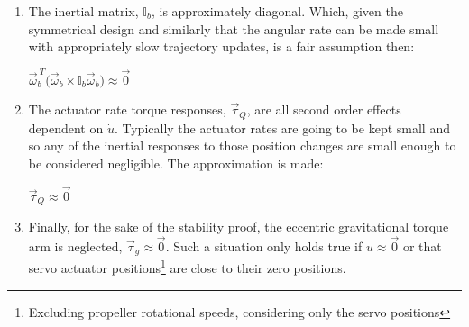 \begin{enumerate}[itemsep=0em]
\item The inertial matrix, $\mathbb{I}_b$, is approximately diagonal. Which, given the symmetrical design and similarly that the angular rate can be made small with appropriately slow trajectory updates, is a fair assumption then:
\begin{center}
\vspace{-10pt}
$\vec{\omega}_b^{~T}\big(\vec{\omega}_b\times\mathbb{I}_b\vec{\omega}_b\big)\approx\vec{0}$
\vspace{-8pt}
\end{center}
\item The actuator rate torque responses, $\vec{\tau}_Q$, are all second order effects dependent on $\dot{u}$. Typically the actuator rates are going to be kept small and so any of the inertial responses to those position changes are small enough to be considered negligible. The approximation is made:
\begin{center}
\vspace{-10pt}
$\vec{\tau}_Q\approx\vec{0}$
\vspace{-8pt}
\end{center}
\item Finally, for the sake of the stability proof, the eccentric gravitational torque arm is neglected, $\vec{\tau}_g\approx\vec{0}$. Such a situation only holds true if $u\approx\vec{0}$ or that servo actuator positions\footnote{Excluding propeller rotational speeds, considering only the servo positions} are close to their zero positions.
\end{enumerate}

